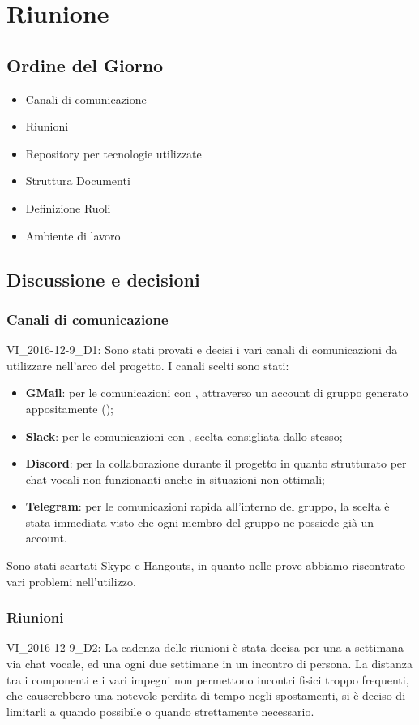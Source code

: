 \section{Riunione}
\subsection{Ordine del Giorno}
\begin{itemize}
	\item Canali di comunicazione
	\item Riunioni
	\item Repository per tecnologie utilizzate
	\item Struttura Documenti
	\item Definizione Ruoli
	\item Ambiente di lavoro
\end{itemize}

\subsection{Discussione e decisioni}
\subsubsection{Canali di comunicazione}
VI\_2016-12-9\_D1: Sono stati provati e decisi i  vari canali di comunicazioni da utilizzare nell'arco del progetto.
I canali scelti sono stati:
\begin{itemize}
	\item \textbf{GMail}: per le comunicazioni con \CommittenteInline{}, attraverso un account di gruppo generato appositamente (\GroupEmail{});
	\item \textbf{Slack}: per le comunicazioni con \Proponente{}, scelta consigliata dallo stesso;
	\item \textbf{Discord}: per la collaborazione durante il progetto in quanto strutturato per chat vocali non funzionanti anche in situazioni non ottimali;
	\item \textbf{Telegram}: per le comunicazioni rapida all'interno del gruppo, la scelta è stata immediata visto che ogni membro del gruppo ne possiede già un account.
\end{itemize}
Sono stati scartati Skype e Hangouts, in quanto nelle prove abbiamo riscontrato vari problemi nell'utilizzo.

\subsubsection{Riunioni}
VI\_2016-12-9\_D2: La cadenza delle riunioni è stata decisa per una a settimana via chat vocale, ed una ogni due settimane in un incontro di persona.
La distanza tra i componenti e i vari impegni non permettono incontri fisici troppo frequenti, che causerebbero una notevole perdita di tempo negli spostamenti, si è deciso di limitarli a quando possibile o quando strettamente necessario.

